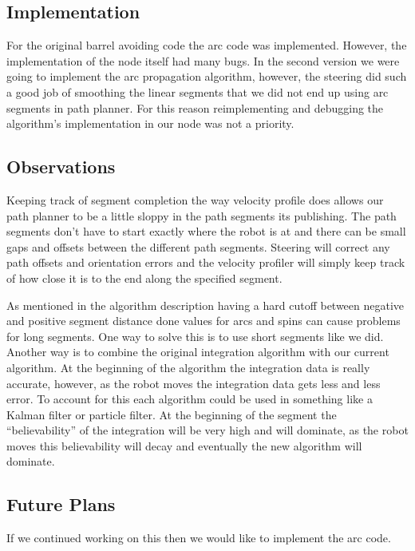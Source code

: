 \subsection{Implementation}

For the original barrel avoiding code the arc code was implemented. However, the implementation of the node itself had many bugs.  In the second version we were going to implement the arc propagation algorithm, however, the steering did such a good job of smoothing the linear segments that we did not end up using arc segments in path planner. For this reason reimplementing and debugging the algorithm's implementation in our node was not a priority.

\subsection{Observations}

Keeping track of segment completion the way velocity profile does allows our path planner to be a little sloppy in the path segments its publishing. The path segments don't have to start exactly where the robot is at and there can be small gaps and offsets between the different path segments. Steering will correct any path offsets and orientation errors and the velocity profiler will simply keep track of how close it is to the end along the specified segment.

As mentioned in the algorithm description having a hard cutoff between negative and positive segment distance done values for arcs and spins can cause problems for long segments. One way to solve this is to use short segments like we did. Another way is to combine the original integration algorithm with our current algorithm. At the beginning of the algorithm the integration data is really accurate, however, as the robot moves the integration data gets less and less error. To account for this each algorithm could be used in something like a Kalman filter or particle filter. At the beginning of the segment the ``believability'' of the integration will be very high and will dominate, as the robot moves this believability will decay and eventually the new algorithm will dominate.

\subsection{Future Plans}
If we continued working on this then we would like to implement the arc code.